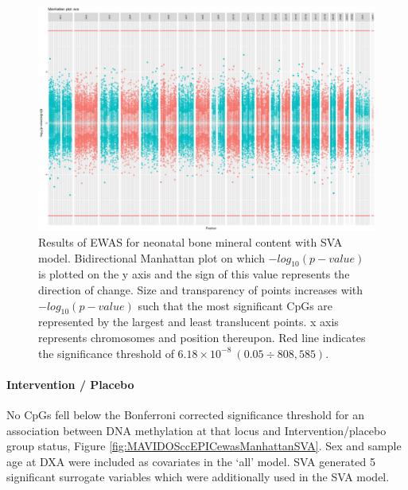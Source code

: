 \documentclass[
]{book}
\begin{document}
\begin{figure}

{\centering \includegraphics[width=0.8\linewidth]{figs/MAVIDOSbmcEPICewasManhattanSVA} 

}

\caption{Results of EWAS for neonatal bone mineral content with SVA model. Bidirectional Manhattan plot on which \(-log_{10}(p-value)\) is plotted on the y axis and the sign of this value represents the direction of change. Size and transparency of points increases with \(-log_{10}(p-value)\) such that the most significant CpGs are represented by the largest and least translucent points. x axis represents chromosomes and position thereupon. Red line indicates the significance threshold of \(6.18\times10^{-8}~(0.05\div808,585)\).}\label{fig:MAVIDOSbmcEPICewasManhattanSVA}
\end{figure}



\hypertarget{intervention-placebo}{%
\paragraph{Intervention / Placebo}\label{intervention-placebo}}

No CpGs fell below the Bonferroni corrected significance threshold for an association between DNA methylation at that locus and Intervention/placebo group status, Figure \ref{fig:MAVIDOSccEPICewasManhattanSVA}.
Sex and sample age at DXA were included as covariates in the `all' model.
SVA generated 5 significant surrogate variables which were additionally used in the SVA model.
\end{document}
